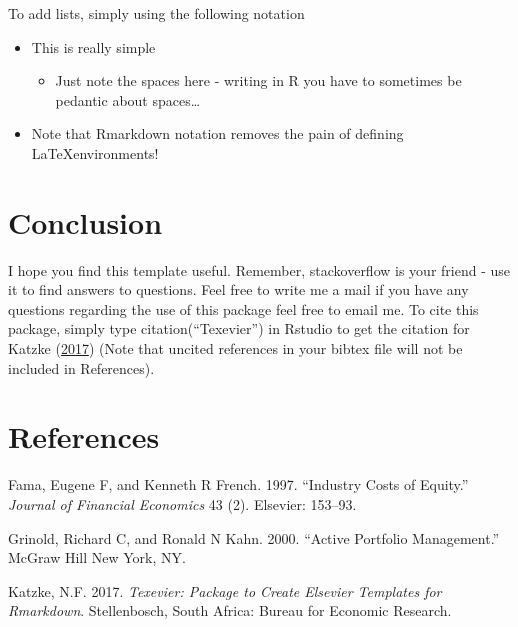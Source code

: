 \documentclass[12pt,a4paper]{article}
\numberwithin{equation}{section}
\numberwithin{figure}{section}
\numberwithin{table}{section}
\renewcommand{\baselinestretch}{1.5}
\begin{document}
To add lists, simply using the following notation

\begin{itemize}
\item
  This is really simple

  \begin{itemize}
  \tightlist
  \item
    Just note the spaces here - writing in R you have to sometimes be
    pedantic about spaces\ldots{}
  \end{itemize}
\item
  Note that Rmarkdown notation removes the pain of defining
  \LaTeX environments!
\end{itemize}

\section{Conclusion}\label{conclusion}

I hope you find this template useful. Remember, stackoverflow is your
friend - use it to find answers to questions. Feel free to write me a
mail if you have any questions regarding the use of this package feel
free to email me. To cite this package, simply type
citation(``Texevier'') in Rstudio to get the citation for Katzke
(\protect\hyperlink{ref-Texevier}{2017}) (Note that uncited references
in your bibtex file will not be included in References).

\section*{References}\label{references}

\hypertarget{refs}{}
\hypertarget{ref-fama1997}{}
Fama, Eugene F, and Kenneth R French. 1997. ``Industry Costs of
Equity.'' \emph{Journal of Financial Economics} 43 (2). Elsevier:
153--93.

\hypertarget{ref-grinold2000}{}
Grinold, Richard C, and Ronald N Kahn. 2000. ``Active Portfolio
Management.'' McGraw Hill New York, NY.

\hypertarget{ref-Texevier}{}
Katzke, N.F. 2017. \emph{Texevier: Package to Create Elsevier Templates
for Rmarkdown}. Stellenbosch, South Africa: Bureau for Economic
Research.

\newpage
\renewcommand{\baselinestretch}{1}
\nocite{*}

\end{document}
